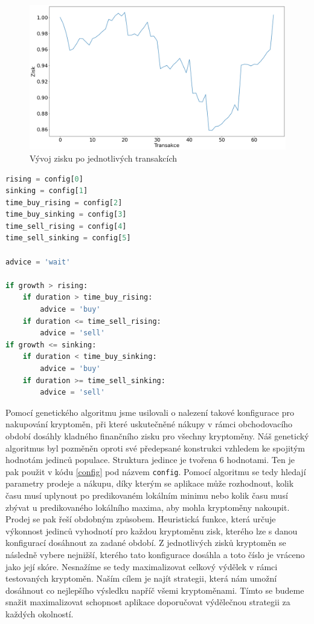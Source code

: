 \begin{figure}
    \caption{Vývoj zisku po jednotlivých transakcích}
    \label{evolution}
    \centering
    \includegraphics[width=\textwidth]{evolution.png}
\end{figure}

\begin{lstlisting}[caption={~Přiřazení akce na základě konfigurace},label=config,captionpos=t,float,abovecaptionskip=-\medskipamount,belowcaptionskip=\medskipamount,language=Python]
rising = config[0]
sinking = config[1]
time_buy_rising = config[2]
time_buy_sinking = config[3]
time_sell_rising = config[4]
time_sell_sinking = config[5]

advice = 'wait'

if growth > rising:
    if duration > time_buy_rising:
        advice = 'buy'
    if duration <= time_sell_rising:
        advice = 'sell'
if growth <= sinking:
    if duration < time_buy_sinking:
        advice = 'buy'
    if duration >= time_sell_sinking:
        advice = 'sell'
\end{lstlisting}

Pomocí genetického algoritmu jsme usilovali o nalezení takové konfigurace pro nakupování kryptoměn, při které uskutečněné nákupy v rámci obchodovacího období dosáhly kladného finančního zisku pro všechny kryptoměny. 
Náš genetický algoritmus byl pozměněn oproti své předepsané konstrukci vzhledem ke spojitým hodnotám jedinců populace. 
Struktura jedince je tvořena 6 hodnotami. Ten je pak použit v kódu \ref{config} pod názvem \verb|config|. 
Pomocí algoritmu se tedy hledají parametry prodeje a nákupu, díky kterým se aplikace může rozhodnout, kolik času musí uplynout po predikovaném lokálním minimu nebo kolik času musí zbývat u predikovaného lokálního maxima, aby mohla kryptoměny nakoupit. 
Prodej se pak řeší obdobným způsobem. 
Heuristická funkce, která určuje výkonnost jedinců vyhodnotí pro každou kryptoměnu zisk, kterého lze s danou konfigurací dosáhnout za zadané období. 
Z jednotlivých zisků kryptoměn se následně vybere nejnižší, kterého tato konfigurace dosáhla a toto číslo je vráceno jako její skóre. 
Nesnažíme se tedy maximalizovat celkový výdělek v rámci testovaných kryptoměn. 
Naším cílem je najít strategii, která nám umožní dosáhnout co nejlepšího výsledku napříč všemi kryptoměnami. 
Tímto se budeme snažit maximalizovat schopnost aplikace doporučovat výdělečnou strategii za každých okolností.


